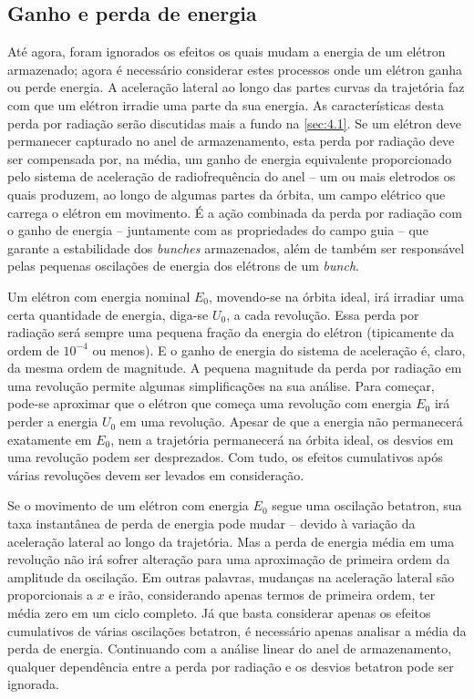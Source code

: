 \subsection{Ganho e perda de energia}\label{sec:3.4}
Até agora, foram ignorados os efeitos os quais mudam a energia de um elétron armazenado; agora é necessário considerar estes processos onde um elétron ganha ou perde energia. A aceleração lateral ao longo das partes curvas da trajetória faz com que um elétron irradie uma parte da sua energia. As características desta perda por radiação serão discutidas mais a fundo na \autoref{sec:4.1}. Se um elétron deve permanecer capturado no anel de armazenamento, esta perda por radiação deve ser compensada por, na média, um ganho de energia equivalente proporcionado pelo sistema de aceleração de radiofrequência do anel -- um ou mais eletrodos os quais produzem, ao longo de algumas partes da órbita, um campo elétrico que carrega o elétron em movimento. É a ação combinada da perda por radiação com o ganho de energia -- juntamente com as propriedades do campo guia -- que garante a estabilidade dos \textit{bunches} armazenados, além de também ser responsável pelas pequenas oscilações de energia dos elétrons de um \textit{bunch}.

Um elétron com energia nominal $E_0$, movendo-se na órbita ideal, irá irradiar uma certa quantidade de energia, diga-se $U_0$, a cada revolução. Essa perda por radiação será sempre uma pequena fração da energia do elétron (tipicamente da ordem de $10^{-4}$ ou menos). E o ganho de energia do sistema de aceleração é, claro, da mesma ordem de magnitude. A pequena magnitude da perda por radiação em uma revolução permite algumas simplificações na sua análise. Para começar, pode-se aproximar que o elétron que começa uma revolução com energia $E_0$ irá perder a energia $U_0$ em uma revolução. Apesar de que a energia não permanecerá exatamente em $E_0$, nem a trajetória permanecerá na órbita ideal, os desvios em uma revolução podem ser desprezados. Com tudo, os efeitos cumulativos após várias revoluções devem ser levados em consideração.

Se o movimento de um elétron com energia $E_0$ segue uma oscilação betatron, sua taxa instantânea de perda de energia pode mudar -- devido à variação da aceleração lateral ao longo da trajetória. Mas a perda de energia média em uma revolução não irá sofrer alteração para uma aproximação de primeira ordem da amplitude da oscilação. Em outras palavras, mudanças na aceleração lateral são proporcionais a $x$ e irão, considerando apenas termos de primeira ordem, ter média zero em um ciclo completo. Já que basta considerar apenas os efeitos cumulativos de várias oscilações betatron, é necessário apenas analisar a média da perda de energia. Continuando com a análise linear do anel de armazenamento, qualquer dependência entre a perda por radiação e os desvios betatron pode ser ignorada.

